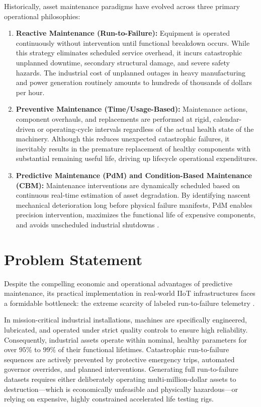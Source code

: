 \documentclass[12pt,a4paper,oneside]{report}
\begin{document}
Historically, asset maintenance paradigms have evolved across three primary operational philosophies:
\begin{enumerate}
    \item \textbf{Reactive Maintenance (Run-to-Failure):} Equipment is operated continuously without intervention until functional breakdown occurs. While this strategy eliminates scheduled service overhead, it incurs catastrophic unplanned downtime, secondary structural damage, and severe safety hazards. The industrial cost of unplanned outages in heavy manufacturing and power generation routinely amounts to hundreds of thousands of dollars per hour.
    \item \textbf{Preventive Maintenance (Time/Usage-Based):} Maintenance actions, component overhauls, and replacements are performed at rigid, calendar-driven or operating-cycle intervals regardless of the actual health state of the machinery. Although this reduces unexpected catastrophic failures, it inevitably results in the premature replacement of healthy components with substantial remaining useful life, driving up lifecycle operational expenditures.
    \item \textbf{Predictive Maintenance (PdM) and Condition-Based Maintenance (CBM):} Maintenance interventions are dynamically scheduled based on continuous real-time estimation of asset degradation. By identifying nascent mechanical deterioration long before physical failure manifests, PdM enables precision intervention, maximizes the functional life of expensive components, and avoids unscheduled industrial shutdowns \cite{lei2018machinery}.
\end{enumerate}

\section{Problem Statement}
Despite the compelling economic and operational advantages of predictive maintenance, its practical implementation in real-world IIoT infrastructures faces a formidable bottleneck: the extreme scarcity of labeled run-to-failure telemetry \cite{chandola2009anomaly}. 

In mission-critical industrial installations, machines are specifically engineered, lubricated, and operated under strict quality controls to ensure high reliability. Consequently, industrial assets operate within nominal, healthy parameters for over $95\%$ to $99\%$ of their functional lifetimes. Catastrophic run-to-failure sequences are actively prevented by protective emergency trips, automated governor overrides, and planned interventions. Generating full run-to-failure datasets requires either deliberately operating multi-million-dollar assets to destruction—which is economically unfeasible and physically hazardous—or relying on expensive, highly constrained accelerated life testing rigs.
\end{document}
